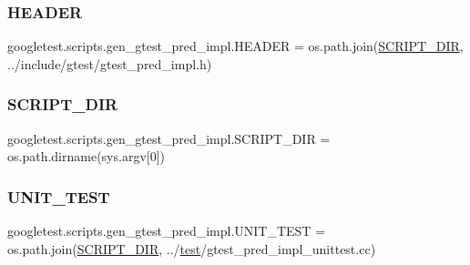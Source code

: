 \subsubsection{\texorpdfstring{HEADER}{HEADER}}
{\footnotesize\ttfamily googletest.\+scripts.\+gen\+\_\+gtest\+\_\+pred\+\_\+impl.\+H\+E\+A\+D\+ER = os.\+path.\+join(\mbox{\hyperlink{namespacegoogletest_1_1scripts_1_1gen__gtest__pred__impl_a5c80a5c6472115a9c5b15f18254df8cd}{S\+C\+R\+I\+P\+T\+\_\+\+D\+IR}}, \textquotesingle{}../include/gtest/gtest\+\_\+pred\+\_\+impl.\+h\textquotesingle{})}

\mbox{\label{namespacegoogletest_1_1scripts_1_1gen__gtest__pred__impl_a5c80a5c6472115a9c5b15f18254df8cd}} 
\subsubsection{\texorpdfstring{SCRIPT\_DIR}{SCRIPT\_DIR}}
{\footnotesize\ttfamily googletest.\+scripts.\+gen\+\_\+gtest\+\_\+pred\+\_\+impl.\+S\+C\+R\+I\+P\+T\+\_\+\+D\+IR = os.\+path.\+dirname(sys.\+argv\mbox{[}0\mbox{]})}

\mbox{\label{namespacegoogletest_1_1scripts_1_1gen__gtest__pred__impl_aae5f18b95e40b267265d18f1c6b792ce}} 
\subsubsection{\texorpdfstring{UNIT\_TEST}{UNIT\_TEST}}
{\footnotesize\ttfamily googletest.\+scripts.\+gen\+\_\+gtest\+\_\+pred\+\_\+impl.\+U\+N\+I\+T\+\_\+\+T\+E\+ST = os.\+path.\+join(\mbox{\hyperlink{namespacegoogletest_1_1scripts_1_1gen__gtest__pred__impl_a5c80a5c6472115a9c5b15f18254df8cd}{S\+C\+R\+I\+P\+T\+\_\+\+D\+IR}}, \textquotesingle{}../\mbox{\hyperlink{_mutual_8h_a707ee03719e99670bf6cfdfd897b8456}{test}}/gtest\+\_\+pred\+\_\+impl\+\_\+unittest.\+cc\textquotesingle{})}


